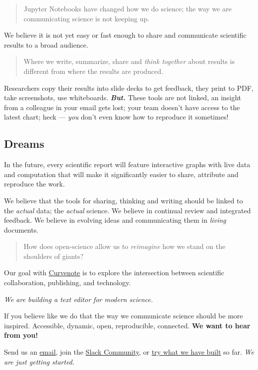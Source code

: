 \begin{quote}
  Jupyter Notebooks have changed how we do science; the way we are communicating science is not keeping up.
\end{quote}

We believe it is not yet easy or fast enough to share and communicate scientific results to a broad audience.

\begin{quote}
  Where we write, summarize, share and \textit{think together} about results is different from where the results are produced.
\end{quote}

Researchers copy their results into slide decks to get feedback, they print to PDF, take screenshots, use whiteboards. \textit{\textbf{But.}} These tools are not linked, an insight from a colleague in your email gets lost; your team doesn’t have access to the latest chart; heck — \textit{you} don’t even know how to reproduce it sometimes!

\subsection*{Dreams}

In the future, every scientific report will feature interactive graphs with live data and computation that will make it significantly easier to share, attribute and reproduce the work.

We believe that the tools for sharing, thinking and writing should be linked to the \textit{actual} data; the \textit{actual} science. We believe in continual review and integrated feedback. We believe in evolving ideas and communicating them in \textit{living} documents.

\begin{quote}
  How does open-science allow us to \textit{reimagine} how we stand on the shoulders of giants?
\end{quote}

Our goal with \href{https://curvenote.com}{Curvenote} is to explore the intersection between scientific collaboration, publishing, and technology.

\textit{We are building a text editor for modern science.}

If you believe like we do that the way we communicate science should be more inspired. Accessible, dynamic, open, reproducible, connected. \textbf{We want to hear from you!}

Send us an \href{mailto:hi@curvenote.com}{email}, join the \href{https://slack.curvenote.dev/}{Slack Community}, or \href{https://curvenote.com}{try what we have built} so far. \textit{We are just getting started.}